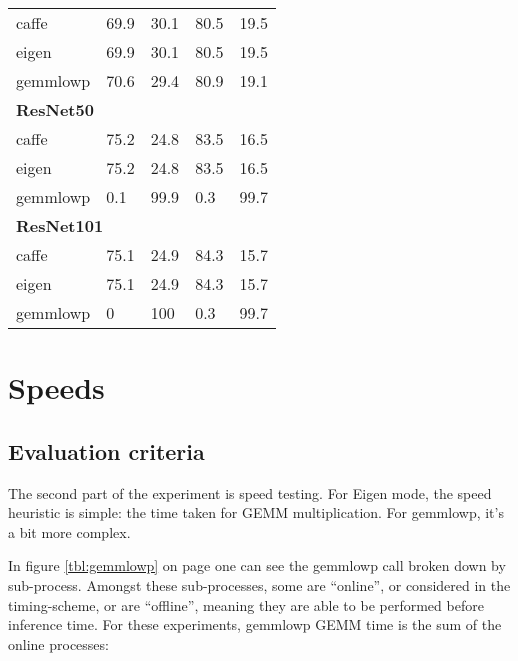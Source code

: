 \begin{table}[]
\begin{tabular}{lllll}
caffe                & 69.9                         & 30.1                 & 80.5                         & 19.5                 \\
eigen                & 69.9                         & 30.1                 & 80.5                         & 19.5                 \\
gemmlowp             & 70.6                         & 29.4                 & 80.9                         & 19.1                 \\
\multicolumn{5}{l}{\textbf{ResNet50}}                                                                                            \\
caffe                & 75.2                         & 24.8                 & 83.5                         & 16.5                 \\
eigen                & 75.2                         & 24.8                 & 83.5                         & 16.5                 \\
gemmlowp             & 0.1                          & 99.9                 & 0.3                          & 99.7                 \\
\multicolumn{5}{l}{\textbf{ResNet101}}                                                                                           \\
caffe                & 75.1                         & 24.9                 & 84.3                         & 15.7                 \\
eigen                & 75.1                         & 24.9                 & 84.3                         & 15.7                 \\
gemmlowp             & 0                            & 100                  & 0.3                          & 99.7                
\end{tabular}
\end{table}

\section{Speeds}
\subsection{Evaluation criteria}
The second part of the experiment is speed testing. For Eigen mode, the speed heuristic is simple: the time taken for GEMM multiplication. For gemmlowp, it's a bit more complex.

In figure \ref{tbl:gemmlowp} on page \pageref{tbl:gemmlowp} one can see the gemmlowp call broken down by sub-process. Amongst these sub-processes, some are ``online'', or considered in the timing-scheme, or are ``offline'', meaning they are able to be performed before inference time. For these experiments, gemmlowp GEMM time is the sum of the online processes:

